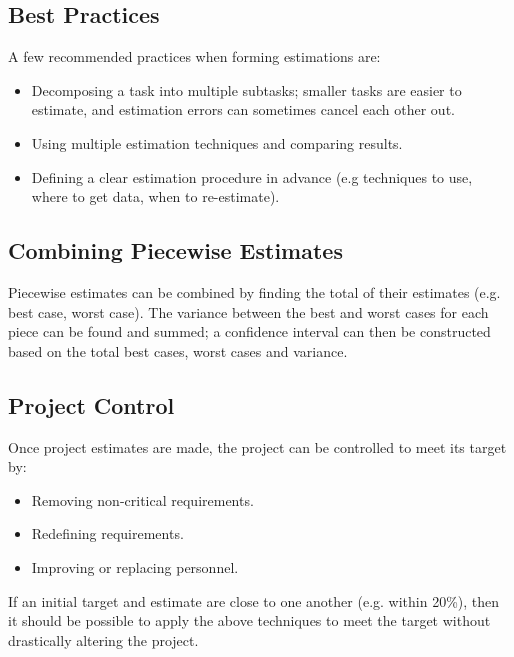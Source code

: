\documentclass[12pt,titlepage]{article}
\begin{document}
    \subsection{Best Practices}
      A few recommended practices when forming estimations are:
      \begin{itemize}
        \item Decomposing a task into multiple subtasks; smaller tasks are easier to estimate, and estimation errors can sometimes cancel each other out.
        \item Using multiple estimation techniques and comparing results.
        \item Defining a clear estimation procedure in advance (e.g techniques to use, where to get data, when to re-estimate).
      \end{itemize}

    \subsection{Combining Piecewise Estimates}
      Piecewise estimates can be combined by finding the total of their estimates (e.g. best case, worst case). The variance between
      the best and worst cases for each piece can be found and summed; a confidence interval can then be constructed based on the total
      best cases, worst cases and variance.

    \subsection{Project Control}
      Once project estimates are made, the project can be controlled to meet its target by:
      \begin{itemize}
        \item Removing non-critical requirements.
        \item Redefining requirements.
        \item Improving or replacing personnel.
      \end{itemize}

      If an initial target and estimate are close to one another (e.g. within 20\%), then it should be possible to apply the above techniques
      to meet the target without drastically altering the project.
\end{document}
